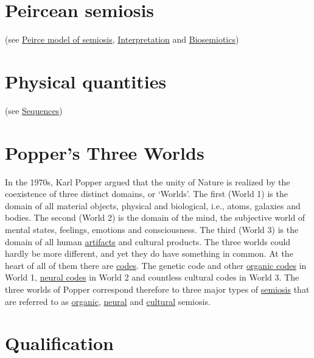 \documentclass[12pt]{article}
\begin{document}
\hypertarget{peircean_semiosis}{}
\section{Peircean semiosis} (see \hyperlink{peirce_model_of_semiosis}{Peirce model of semiosis}, \hyperlink{interpretation}{Interpretation} and \hyperlink{biosemiotics}{Biosemiotics})


\hypertarget{physical_quantities}{}
\section{Physical quantities} (see \hyperlink{sequences}{Sequences})

\hypertarget{poppers_three_worlds}{}
\section{Popper's Three Worlds} 
In the 1970s, Karl Popper argued that the unity of Nature is realized by the coexistence of three distinct domains, or `Worlds'. The first (World 1) is the domain of all material objects, physical and biological, i.e., atoms, galaxies and bodies. The second (World 2) is the domain of the mind, the subjective world of mental states, feelings, emotions and consciousness. The third (World 3) is the domain of all human \hyperlink{artifacts}{artifacts} and cultural products. The three worlds could hardly be more different, and yet they do have something in common. At the heart of all of them there are \hyperlink{code}{codes}. The genetic code and other \hyperlink{organic_codes}{organic codes} in World 1, \hyperlink{neural_codes}{neural codes} in World 2 and countless cultural codes in World 3. The three worlds of Popper correspond therefore to three major types of \hyperlink{semiosis}{semiosis} that are referred to as \hyperlink{organic_semiosis}{organic}, \hyperlink{neural_semiosis}{neural} and \hyperlink{cultural_semiosis}{cultural} semiosis. 

\hypertarget{qualification}{}
\section{Qualification}


\hypertarget{quantities_qualities_nominables}{}
\end{document}
